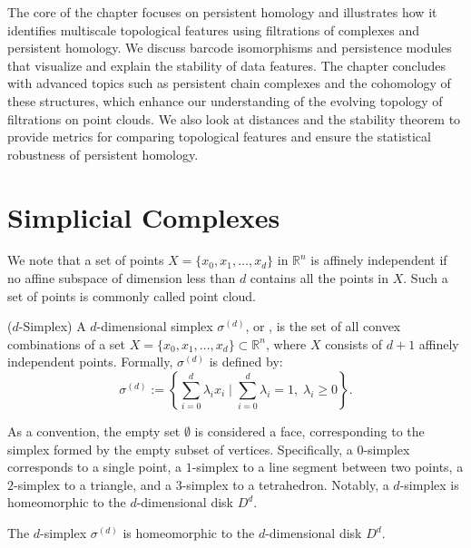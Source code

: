 The core of the chapter focuses on persistent homology and illustrates how it identifies multiscale topological features using filtrations of complexes and persistent homology. We discuss barcode isomorphisms and persistence modules that visualize and explain the stability of data features. The chapter concludes with advanced topics such as persistent chain complexes and the cohomology of these structures, which enhance our understanding of the evolving topology of filtrations on point clouds. We also look at distances and the stability theorem to provide metrics for comparing topological features and ensure the statistical robustness of persistent homology.

\section{Simplicial Complexes}
\label{Simplicial Complexes}
We note that a set of points $X = \{x_{0}, x_{1}, \ldots, x_{d}\}$ in $\mathbb{R}^{n}$ is affinely independent if no affine subspace of dimension less than $d$ contains all the points in $X$. Such a set of points is commonly called point cloud.

\begin{definition}
	{($d$-Simplex) \cite[\S 2.1]{boissonnat2018geometric}} \label{d-simplex} A $d$-dimensional simplex $\sigma^{(d)}$, or , is the set of all convex combinations of a set $X = \{x_{0}, x_{1}, \ldots, x_{d}\} \subset \mathbb{R}^{n}$, where $X$ consists of $d+1$ affinely independent points. Formally, $\sigma^{(d)}$ is defined by:
	\begin{equation}
		\sigma^{(d)} := \left\{\sum_{i=0}^{d} \lambda_i x_i \; | \; \sum_{i=0}^{d} \lambda_i = 1, \; \lambda_i \geq 0\right\}.
	\end{equation}
\end{definition}

As a convention, the empty set $\emptyset$ is considered a face, corresponding to the simplex formed by the empty subset of vertices. Specifically, a $0$-simplex corresponds to a single point, a $1$-simplex to a line segment between two points, a $2$-simplex to a triangle, and a $3$-simplex to a tetrahedron. Notably, a $d$-simplex is homeomorphic to the $d$-dimensional disk $D^{d}$.

\begin{theorem}
    The $d$-simplex $\sigma^{(d)}$ is homeomorphic to the $d$-dimensional disk $D^{d}$.
\end{theorem}

